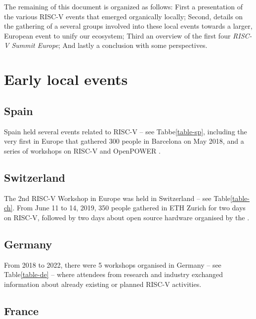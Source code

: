\documentclass[
	a4paper, %
	10pt, %
	unnumberedsections, %
	twoside, %
]{LTJournalArticle}
\begin{document}
The remaining of this document is organized as follows: First a
presentation of the various RISC-V events that emerged organically
locally; Second, details on the gathering of a several groups involved
into these local events towards a larger, European event to unify our
ecosystem; Third an overview of the first four \emph{RISC-V Summit
Europe}; And lastly a conclusion with some perspectives.

\section{Early local events}

\subsection{Spain}



Spain held several events related to RISC-V -- see
Tabbe\;\ref{table-sp}, including the very first 
in Europe that gathered 300 people in Barcelona on May 2018, and a
series of workshops on RISC-V and OpenPOWER \cite{OPENPOWER}.

\subsection{Switzerland}



The 2nd RISC-V Workshop in Europe was held in Switzerland -- see
Table\;\ref{table-ch}. From June 11 to 14, 2019, 350 people gathered
in ETH Zurich for two days on RISC-V, followed by two days about open
source hardware organised by the  \cite{FOSSI}.

\subsection{Germany}



From 2018 to 2022, there were 5 workshops organised in Germany -- see
Table\;\ref{table-de} -- where attendees from research and industry
exchanged information about already existing or planned RISC-V
activities.

\subsection{France}


\end{document}
